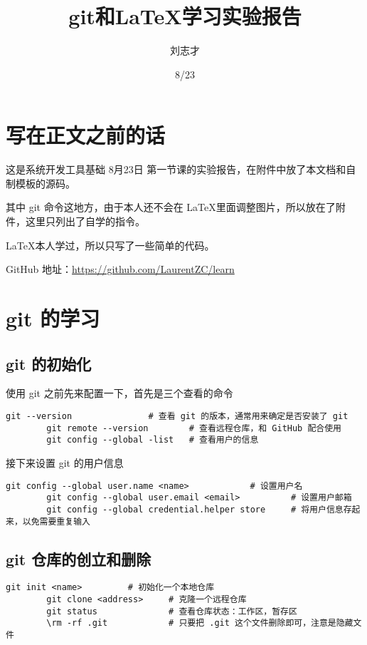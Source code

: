\documentclass{lzc}
\title{git和\LaTeX{}学习实验报告}
\author{刘志才}
\date{8/23}
\begin{document}
    \maketitlepage
    \tableofcontents
    \newpage
    \setcounter{page}{1}


    \section{写在正文之前的话}\label{sec:1}
        这是系统开发工具基础 8月23日 第一节课的实验报告，在附件中放了本文档和自制模板的源码。

        其中 git 命令这地方，由于本人还不会在 \LaTeX 里面调整图片，所以放在了附件，这里只列出了自学的指令。

        \LaTeX 本人学过，所以只写了一些简单的代码。

        GitHub 地址：\href{https://github.com/LaurentZC/learn}{https://github.com/LaurentZC/learn}


    \section{git 的学习}\label{sec:git}

        \subsection{git 的初始化}\label{subsec:1.1}
            使用 git 之前先来配置一下，首先是三个查看的命令

            \begin{lstlisting}[label={lst:1}]
        git --version               # 查看 git 的版本，通常用来确定是否安装了 git
        git remote --version        # 查看远程仓库，和 GitHub 配合使用
        git config --global -list   # 查看用户的信息
            \end{lstlisting}

            接下来设置 git 的用户信息
            \begin{lstlisting}[label={lst:2}]
        git config --global user.name <name>            # 设置用户名
        git config --global user.email <email>          # 设置用户邮箱
        git config --global credential.helper store     # 将用户信息存起来，以免需要重复输入
            \end{lstlisting}

        \subsection{git 仓库的创立和删除}\label{subsec:1.2}
            \begin{lstlisting}[label={lst:3}]
        git init <name>         # 初始化一个本地仓库
        git clone <address>     # 克隆一个远程仓库
        git status              # 查看仓库状态：工作区，暂存区
        \rm -rf .git            # 只要把 .git 这个文件删除即可，注意是隐藏文件
            \end{lstlisting}
\end{document}

